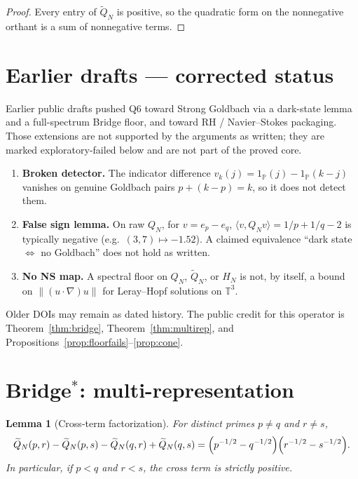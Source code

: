 \documentclass[11pt]{article}
\newtheorem{lemma}[theorem]{Lemma}
\newcommand{\Qt}{\widetilde{Q}}
\begin{document}
\begin{proof}
Every entry of $\Qt_N$ is positive, so the quadratic form on the
nonnegative orthant is a sum of nonnegative terms.
\end{proof}

\section{Earlier drafts --- corrected status}

Earlier public drafts pushed Q6 toward Strong Goldbach via a
dark-state lemma and a full-spectrum Bridge floor, and toward
RH / Navier--Stokes packaging. Those extensions are not supported
by the arguments as written; they are marked exploratory-failed below
and are not part of the proved core.

\begin{enumerate}[leftmargin=1.2em]
\item \textbf{Broken detector.}
The indicator difference
$v_k(j)=1_{\mathbb{P}}(j)-1_{\mathbb{P}}(k-j)$
vanishes on genuine Goldbach pairs $p+(k-p)=k$, so it does not detect
them.
\item \textbf{False sign lemma.}
On raw $Q_N$, for $v=e_p-e_q$,
$\langle v,Q_N v\rangle=1/p+1/q-2$ is typically negative
(e.g.\ $(3,7)\mapsto -1.52$).
A claimed equivalence ``dark state $\Leftrightarrow$ no Goldbach'' does
not hold as written.
\item \textbf{No NS map.}
A spectral floor on $Q_N$, $\Qt_N$, or $H_N$ is not, by itself, a
bound on $\|(u\cdot\nabla)u\|$ for Leray--Hopf solutions on
$\mathbb{T}^3$.
\end{enumerate}

Older DOIs may remain as dated history.
The public credit for this operator is
Theorem~\ref{thm:bridge}, Theorem~\ref{thm:multirep}, and
Propositions~\ref{prop:floorfails}--\ref{prop:cone}.

\section{Bridge$^*$: multi-representation}

\begin{lemma}[Cross-term factorization]\label{lem:cross}
For distinct primes $p\neq q$ and $r\neq s$,
\[
\widetilde Q_N(p,r)-\widetilde Q_N(p,s)-\widetilde Q_N(q,r)+\widetilde Q_N(q,s)
=\Bigl(p^{-1/2}-q^{-1/2}\Bigr)\Bigl(r^{-1/2}-s^{-1/2}\Bigr).
\]
In particular, if $p<q$ and $r<s$, the cross term is strictly positive.
\end{lemma}
\end{document}
